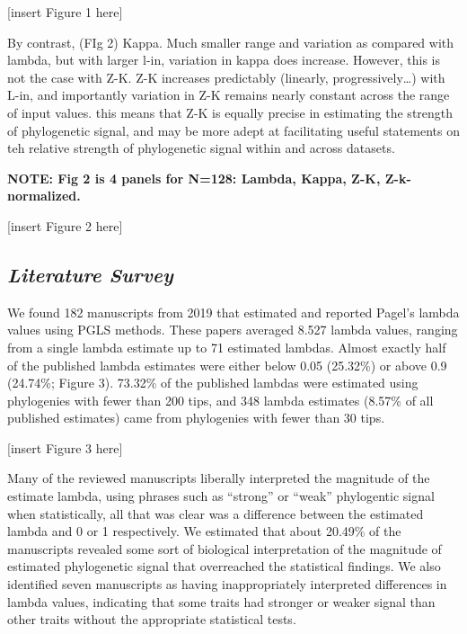 \documentclass[
]{article}
\begin{document}
{[}insert Figure 1 here{]} \hfill\break

By contrast, (FIg 2) Kappa. Much smaller range and variation as compared
with lambda, but with larger l-in, variation in kappa does increase.
However, this is not the case with Z-K. Z-K increases predictably
(linearly, progressively\ldots) with L-in, and importantly variation in
Z-K remains nearly constant across the range of input values. this means
that Z-K is equally precise in estimating the strength of phylogenetic
signal, and may be more adept at facilitating useful statements on teh
relative strength of phylogenetic signal within and across datasets.
\hfill\break

\textbf{NOTE: Fig 2 is 4 panels for N=128: Lambda, Kappa, Z-K,
Z-k-normalized.}

{[}insert Figure 2 here{]} \hfill\break 

\hypertarget{literature-survey-1}{%
\subsection{\texorpdfstring{\emph{Literature
Survey}}{Literature Survey}}\label{literature-survey-1}}

We found 182 manuscripts from 2019 that estimated and reported Pagel's
lambda values using PGLS methods. These papers averaged 8.527 lambda
values, ranging from a single lambda estimate up to 71 estimated
lambdas. Almost exactly half of the published lambda estimates were
either below 0.05 (25.32\%) or above 0.9 (24.74\%; Figure 3). 73.32\% of
the published lambdas were estimated using phylogenies with fewer than
200 tips, and 348 lambda estimates (8.57\% of all published estimates)
came from phylogenies with fewer than 30 tips. \hfill\break

{[}insert Figure 3 here{]} \hfill\break

Many of the reviewed manuscripts liberally interpreted the magnitude of
the estimate lambda, using phrases such as ``strong'' or ``weak''
phylogentic signal when statistically, all that was clear was a
difference between the estimated lambda and 0 or 1 respectively. We
estimated that about 20.49\% of the manuscripts revealed some sort of
biological interpretation of the magnitude of estimated phylogenetic
signal that overreached the statistical findings. We also identified
seven manuscripts as having inappropriately interpreted differences in
lambda values, indicating that some traits had stronger or weaker signal
than other traits without the appropriate statistical tests.
\hfill\break
\end{document}
